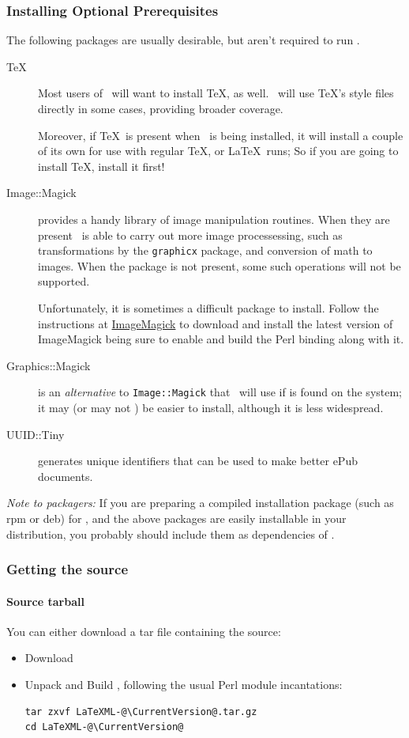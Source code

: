 \documentclass{article}
\begin{document}
\subsubsection{Installing Optional Prerequisites}\label{install.optional}
The following packages are usually desirable, but aren't required to run \LaTeXML.
\begin{description}
\item[\TeX] Most users of \LaTeXML\ will want to install \TeX, as well.  \LaTeXML\ will
use \TeX's style files directly in some cases, providing broader coverage.

Moreover, if \TeX\ is present when \LaTeXML\ is being installed, it will install a couple of
its own for use with regular \TeX, or \LaTeX\ runs;
So if you are going to install \TeX, install it first!

\item[Image::Magick] provides a handy library of image manipulation routines.
When they are present \LaTeXML\ is able to carry out more image processessing,
such as transformations by the \texttt{graphicx} package, and conversion of math to images.
When the package is not present, some such operations will not be supported.

Unfortunately, it is sometimes a difficult package to install.
Follow the instructions at \href{http://www.imagemagick.org/}{ImageMagick}
to download and install the latest version of ImageMagick being sure to enable
and build the Perl binding along with it.

\item[Graphics::Magick] is an \emph{alternative} to \texttt{Image::Magick} that \LaTeXML\ will
use if is found on the system; it may (or may not ) be easier to install, although it
is less widespread.

\item[UUID::Tiny] generates unique identifiers that can be used to make better ePub documents.

\end{description}
\emph{Note to packagers:} If you are preparing a compiled installation package (such as rpm or deb) for
\LaTeXML, and the above packages are easily installable in your distribution,
you probably should include them as dependencies of \LaTeXML.

\subsubsection{Getting the source}\label{getting.source}
\paragraph{Source tarball}\label{source.tarball}
You can either download a tar file containing the source:
\begin{itemize}
\item Download \CurrentTarball
\item Unpack and Build \LaTeXML, following the usual Perl module incantations:
\begin{lstlisting}[style=shell]
tar zxvf LaTeXML-@\CurrentVersion@.tar.gz
cd LaTeXML-@\CurrentVersion@
\end{lstlisting}
\end{itemize}
\end{document}
